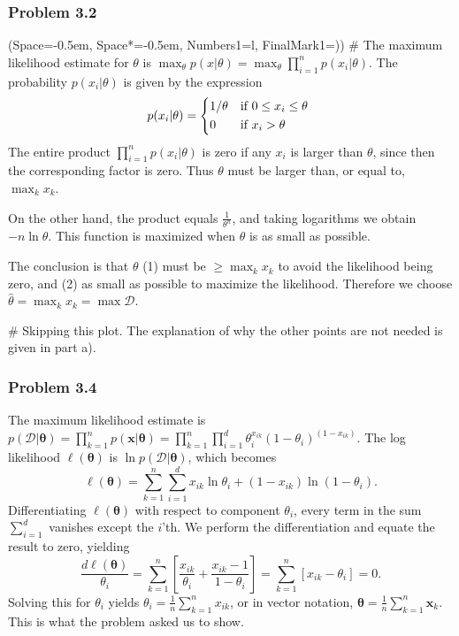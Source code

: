 \documentclass[12pt, a4paper]{article}
\newcommand{\listSpace}{-0.5em}%
\newcommand{\D}{\mathcal{D}}
\newcommand{\vect}[1]{\bm{#1}}
\begin{document}
\subsubsection*{Problem 3.2}
\begin{easylist}[enumerate]
\ListProperties(Space=\listSpace, Space*=\listSpace, Numbers1=l, FinalMark1={)})
# The maximum likelihood estimate for $\theta$ is $\max_\theta p(x | \theta) = \max_\theta \prod_{i=1}^{n} p(x_i | \theta)$.
The probability $p(x_i | \theta)$ is given by the expression
\begin{equation*}
	p(x_i | \theta) = 
	\begin{dcases*}
	1/\theta & if $0 \leq x_i \leq \theta$ \\
	0 & if $ x_i > \theta$
	\end{dcases*}
\end{equation*}
The entire product $\prod_{i=1}^{n} p(x_i | \theta)$ is zero if any $x_i$ is larger than $\theta$, since then the corresponding factor is zero.
Thus $\theta$ must be larger than, or equal to, $\max_k x_k$.

On the other hand, the product equals $\frac{1}{\theta^n}$, and taking logarithms we obtain $-n \ln \theta$.
This function is maximized when $\theta$ is as small as possible.

The conclusion is that $\theta$ (1) must be $\geq \max_k x_k$ to avoid the likelihood being zero, and (2) as small as possible to maximize the likelihood.
Therefore we choose $\hat{\theta} = \max_k x_k = \max \D$.

# Skipping this plot. The explanation of why the other points are not needed is given in part a).
\end{easylist}

\subsubsection*{Problem 3.4}
The maximum likelihood estimate is $p( \D | \vect{\theta}) = \prod_{k = 1}^{n} p( \vect{x} | \vect{\theta}) = \prod_{k = 1}^{n} \prod_{i=1}^{d}
 \theta_{i}^{x_{ik}} \left( 1 - \theta_i \right)^{\left(  1 - x_{ik} \right)}$.
 The log likelihood $\ell(\vect{\theta})$ is $ \ln p( \D | \vect{\theta}) $, which becomes
 \begin{equation*}
 	\ell(\vect{\theta}) = \sum_{k = 1}^{n} \sum_{i=1}^{d}
 	x_{ik} \ln \theta_i + (1 - x_{ik}) \ln \left( 1 - \theta_i\right).
 \end{equation*}
Differentiating $\ell(\vect{\theta})$ with respect to component $\theta_i$, every term in the sum $\sum_{i=1}^{d}$ vanishes except the $i$'th.
We perform the differentiation and equate the result to zero, yielding
\begin{equation*}
	\frac{d \ell(\vect{\theta})}{\theta_i} = \sum_{k=1}^{n} \left[ \frac{x_{ik}}{\theta_i} + \frac{x_{ik} - 1}{1 - \theta_i} \right] =
	 \sum_{k=1}^{n} \left[ x_{ik} - \theta_i \right] = 0.
\end{equation*}
Solving this for $\theta_i$ yields $\theta_i = \frac{1}{n} \sum_{k=1}^{n} x_{ik}$, or in vector notation, $\vect{\theta} = \frac{1}{n} \sum_{k=1}^{n} \vect{x}_k$.
This is what the problem asked us to show.
\end{document}

